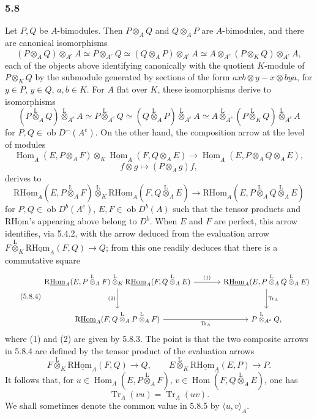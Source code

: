 \documentclass[11pt]{article}
\providecommand{\uHom}{\underline{\Hom}}
\DeclareMathOperator{\Hom}{Hom}
\newcommand{\ob}{\operatorname{ob}}
\providecommand{\Tr}{\operatorname{Tr}}
\providecommand{\Tr}{\operatorname{Tr}}
\providecommand{\lten}{\overset{\mathrm L}{\otimes}}
\providecommand{\Tr}{\operatorname{Tr}}
\providecommand{\Hom}{\operatorname{Hom}}
\providecommand{\ob}{\operatorname{ob}}
\providecommand{\lten}{\overset{\mathrm L}{\otimes}}
\providecommand{\lten}{\overset{\mathrm L}{\otimes}}
\providecommand{\Tr}{\operatorname{Tr}}
\providecommand{\lten}{\overset{\mathrm L}{\otimes}}
\providecommand{\lten}{\overset{\mathrm L}{\otimes}}
\providecommand{\lten}{\overset{\mathrm L}{\otimes}}
\providecommand{\Hom}{\operatorname{Hom}}
\providecommand{\Tr}{\operatorname{Tr}}
\providecommand{\lten}{\overset{\mathrm L}{\otimes}}
\begin{document}
\subsubsection*{5.8}

Let $P,Q$ be $A$-bimodules. Then $P\otimes_AQ$ and $Q\otimes_AP$ are $A$-bimodules, and there are canonical isomorphisms
\begin{equation}\tag{5.8.1}
(P\otimes_AQ)\otimes_{A^e}A\simeq P\otimes_{A^e}Q\simeq(Q\otimes_AP)\otimes_{A^e}A\simeq A\otimes_{A^e}(P\otimes_KQ)\otimes_{A^e}A,
\end{equation}
each of the objects above identifying canonically with the quotient $K$-module of $P\otimes_KQ$ by the submodule generated by sections of the form $axb\otimes y-x\otimes bya$, for $y\in P$, $y\in Q$, $a,b\in K$. For $A$ flat over $K$, these isomorphisms derive to isomorphisms
\begin{equation}\tag{5.8.2}
(P\lten_AQ)\lten_{A^e}A\simeq P\lten_{A^e}Q\simeq(Q\lten_AP)\lten_{A^e}A\simeq A\lten_{A^e}(P\lten_KQ)\lten_{A^e}A
\end{equation}
for $P,Q\in\ob D^-(A^e)$. On the other hand, the composition arrow at the level of modules
\[
\uHom_A(E,P\otimes_AF)\otimes_K\uHom_A(F,Q\otimes_AE)
\longrightarrow\uHom_A(E,P\otimes_AQ\otimes_AE),
\]
\[
f\otimes g\longmapsto (P\otimes_Ag)f,
\]
derives to
\begin{equation}\tag{5.8.3}
\mathrm{R}\underline{\mathrm{Hom}}_A(E,P\lten_AF)\lten_K\mathrm{R}\underline{\mathrm{Hom}}_A(F,Q\lten_AE)
\longrightarrow\mathrm{R}\underline{\mathrm{Hom}}_A(E,P\lten_AQ\lten_AE)
\end{equation}
for $P,Q\in\ob D^b(A^e)$, $E,F\in\ob D^b(A)$ such that the tensor products and $\mathrm{R}\underline{\mathrm{Hom}}$'s appearing above belong to $D^b$. When $E$ and $F$ are perfect, this arrow identifies, via 5.4.2, with the arrow deduced from the evaluation arrow $F\lten_K\mathrm{R}\underline{\mathrm{Hom}}_A(F,Q)\to Q$; from this one readily deduces that there is a commutative square
\begin{equation}\tag{5.8.4}
\begin{tikzcd}[column sep=large,row sep=large]
\mathrm{R}\underline{\mathrm{Hom}}_A(E,P\lten_AF)\lten_K\mathrm{R}\underline{\mathrm{Hom}}_A(F,Q\lten_AE) \arrow[r,"(1)"] \arrow[d,"(2)"'] & \mathrm{R}\underline{\mathrm{Hom}}_A(E,P\lten_AQ\lten_AE) \arrow[d,"\Tr_A"]\\
\mathrm{R}\underline{\mathrm{Hom}}_A(F,Q\lten_AP\lten_AF) \arrow[r,"\Tr_A"'] & P\lten_{A^e}Q,
\end{tikzcd}
\end{equation}
where (1) and (2) are given by 5.8.3. The point is that the two composite arrows in 5.8.4 are defined by the tensor product of the evaluation arrows
\[
F\lten_K\mathrm{R}\underline{\mathrm{Hom}}_A(F,Q)\longrightarrow Q,\qquad
E\lten_K\mathrm{R}\underline{\mathrm{Hom}}_A(E,P)\longrightarrow P.
\]
It follows that, for $u\in\Hom_A(E,P\lten_AF)$, $v\in\Hom(F,Q\lten_AE)$, one has
\begin{equation}\tag{5.8.5}
\Tr_A(vu)=\Tr_A(uv).
\end{equation}
We shall sometimes denote the common value in 5.8.5 by $\langle u,v\rangle_A$.
\end{document}
